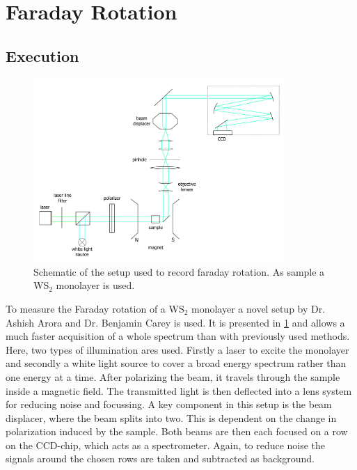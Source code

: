 \newpage
\section{Faraday Rotation}

\subsection{Execution}

\begin{figure}[!ht]
    \centering
    \includegraphics[width=0.85\textwidth]{img/setup3.png}
    \caption{Schematic of the setup used to record faraday rotation. As sample a WS$_2$ monolayer is used.}
    \label{fig_setup3}
\end{figure}
To measure the Faraday rotation of a WS$_2$ monolayer a novel setup by Dr. Ashish Arora and Dr. Benjamin Carey is used.
It is presented in \cref{fig_setup3} and allows a much faster acquisition of a whole spectrum than with previously used methods.
Here, two types of illumination ares used.
Firstly a laser to excite the monolayer and secondly a white light source to cover a broad energy spectrum rather than one energy at a time.
After polarizing the beam, it travels through the sample inside a magnetic field.
The transmitted light is then deflected into a lens system for reducing noise and focussing.
A key component in this setup is the beam displacer, where the beam splits into two.
This is dependent on the change in polarization induced by the sample.
Both beams are then each focused on a row on the CCD-chip, which acts as a spectrometer.
Again, to reduce noise the signals around the chosen rows are taken and subtracted as background.

\

